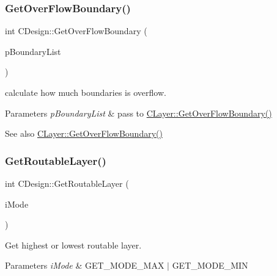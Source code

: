 \subsubsection{\texorpdfstring{GetOverFlowBoundary()}{GetOverFlowBoundary()}}
{\footnotesize\ttfamily int C\+Design\+::\+Get\+Over\+Flow\+Boundary (\begin{DoxyParamCaption}\item[{vector$<$ \mbox{\hyperlink{classCBoundary}{C\+Boundary}} $\ast$ $>$ $\ast$}]{p\+Boundary\+List }\end{DoxyParamCaption})}



calculate how much boundaries is overflow. 


\begin{DoxyParams}{Parameters}
{\em p\+Boundary\+List} & pass to \mbox{\hyperlink{classCLayer_aae29339458f6708296c4c05a36924760}{C\+Layer\+::\+Get\+Over\+Flow\+Boundary()}} \\
\hline
\end{DoxyParams}
\begin{DoxySeeAlso}{See also}
\mbox{\hyperlink{classCLayer_aae29339458f6708296c4c05a36924760}{C\+Layer\+::\+Get\+Over\+Flow\+Boundary()}} 
\end{DoxySeeAlso}
\mbox{\label{classCDesign_a0612a39d1690b74618229f2b88a8ccb0}} 
\subsubsection{\texorpdfstring{GetRoutableLayer()}{GetRoutableLayer()}}
{\footnotesize\ttfamily int C\+Design\+::\+Get\+Routable\+Layer (\begin{DoxyParamCaption}\item[{int}]{i\+Mode }\end{DoxyParamCaption})}



Get highest or lowest routable layer. 


\begin{DoxyParams}{Parameters}
{\em i\+Mode} & G\+E\+T\+\_\+\+M\+O\+D\+E\+\_\+\+M\+AX $\vert$ G\+E\+T\+\_\+\+M\+O\+D\+E\+\_\+\+M\+IN \\
\hline
\end{DoxyParams}
\mbox{\label{classCDesign_a8890c8bb8e27692b75d0a68eaa28b885}} 
